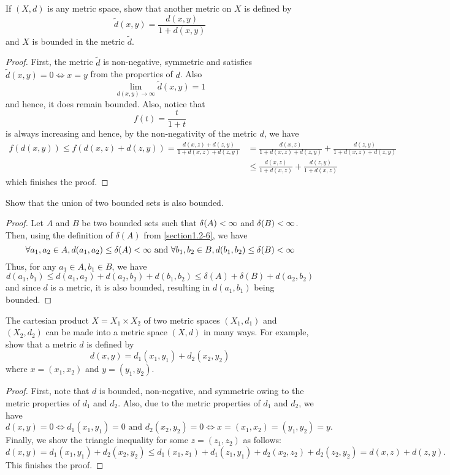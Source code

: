 \begin{question}
    If $(X,d)$ is any metric space, show that another metric on $X$ is defined by 
    \[\tilde{d}(x,y) = \frac{d(x,y)}{1 + d(x,y)}\]
    and $X$ is bounded in the metric $\tilde{d}$.
    \label{section1.2-11}
\end{question}
\begin{proof}
    First, the metric $\tilde{d}$ is non-negative, symmetric and satisfies $\tilde{d}(x,y) = 0 \iff x = y$ from the properties of $d$. Also
    \[\lim\limits_{d(x,y) \rightarrow \infty} \tilde{d}(x,y) = 1\] 
    and hence, it does remain bounded. Also, notice that
    \[f(t) = \frac{t}{1 + t}\]
    is always increasing and hence, by the non-negativity of the metric $d$, we have
    \begin{align*}
        f(d(x,y)) \leq f(d(x,z) + d(z,y)) = \frac{d(x,z) + d(z,y)}{1 + d(x,z) + d(z,y)}  &= \frac{d(x,z)}{1 + d(x,z) + d(z,y)} + \frac{d(z,y)}{1 + d(x,z) + d(z,y)}
        \\
        &\leq \frac{d(x,z)}{1 + d(x,z)} + \frac{d(z,y)}{1 + d(x,z)}
    \end{align*}
    which finishes the proof.
\end{proof}


\begin{question}
    Show that the union of two bounded sets is also bounded.
    \label{section1.2-12}
\end{question}
\begin{proof}
    Let $A$ and $B$ be two bounded sets such that $\delta(A) < \infty$ and $\delta(B) < \infty$. Then, using the definition of $\delta(A)$ from \ref{section1.2-6}, we have
    \[\forall a_1 , a_2 \in A, d(a_1,a_2) \leq \delta(A) < \infty \text{ and } \forall b_1 , b_2 \in B, d(b_1,b_2) \leq \delta(B) < \infty\]
    Thus, for any $a_1 \in A , b_1 \in B$, we have
    \[d(a_1 , b_1) \leq d(a_1 , a_2) + d(a_2,b_2) + d(b_1 , b_2) \leq \delta(A) + \delta(B) + d(a_2 , b_2)\]
    and since $d$ is a metric, it is also bounded, resulting in $d(a_1,b_1)$ being bounded.
\end{proof}

\begin{question}
    The cartesian product $X = X_1 \times X_2$ of two metric spaces $(X_1 , d_1)$ and $(X_2,d_2)$ can be made into a metric space $(X,d)$ in many ways. For example, show that a metric $d$ is defined by 
    \[d(x,y) = d_1(x_1,y_1) + d_2(x_2,y_2)\]
    where $x = (x_1 , x_2)$ and $y = (y_1 , y_2)$.
    \label{section1.2-13}
\end{question}
\begin{proof}
    First, note that $d$ is bounded, non-negative, and symmetric owing to the metric properties of $d_1$ and $d_2$. Also, due to the metric properties of $d_1$ and $d_2$, we have
    \[d(x,y) = 0 \iff d_1(x_1,y_1) = 0 \text{ and } d_2(x_2 , y_2) = 0 \iff x = (x_1,x_2) = (y_1,y_2) = y.\]
    Finally, we show the triangle inequality for some $z = (z_1 , z_2)$ as follows:
    \[d(x,y) = d_1(x_1,y_1) + d_2(x_2,y_2) \leq d_1(x_1 , z_1) + d_1(z_1,y_1) + d_2(x_2,z_2) + d_2(z_2 , y_2) = d(x,z) + d(z,y).\]
    This finishes the proof.
\end{proof}

